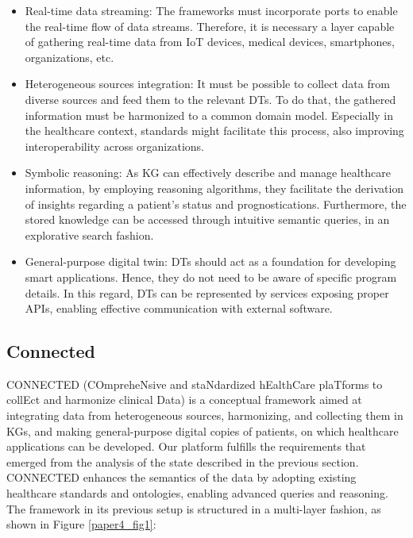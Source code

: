 \begin{itemize}
    \item Real-time data streaming: The frameworks must incorporate ports to enable the real-time flow of data streams. Therefore, it is necessary a layer capable of gathering real-time data from IoT devices, medical devices, smartphones, organizations, etc.
    \item Heterogeneous sources integration: It must be possible to collect data from diverse sources and feed them to the relevant DTs. To do that, the gathered information must be harmonized to a common domain model. Especially in the healthcare context, standards might facilitate this process, also improving interoperability across organizations.
    \item Symbolic reasoning: As KG can effectively describe and manage healthcare information, by employing reasoning algorithms, they facilitate the derivation of insights regarding a patient’s status and prognostications. Furthermore, the stored knowledge can be accessed through intuitive semantic queries, in an explorative search fashion.
    \item General-purpose digital twin: DTs should act as a foundation for developing smart applications. Hence, they do not need to be aware of specific program details. In this regard, DTs can be represented by services exposing proper APIs, enabling effective communication with external software.
\end{itemize}

\subsection{Connected}\label{sec:paper4_connected}

CONNECTED (COmpreheNsive and staNdardized hEalthCare plaTforms to collEct and harmonize clinical Data) is a conceptual framework aimed at integrating data from heterogeneous sources, harmonizing, and collecting them in KGs, and making general-purpose digital copies of patients, on which healthcare applications can be developed. Our platform fulfills the requirements that emerged from the analysis of the state described in the previous section. CONNECTED enhances the semantics of the data by adopting existing healthcare standards and ontologies, enabling advanced queries and reasoning. The framework in its previous setup is structured in a multi-layer fashion, as shown in Figure \ref{paper4_fig1}{}:

